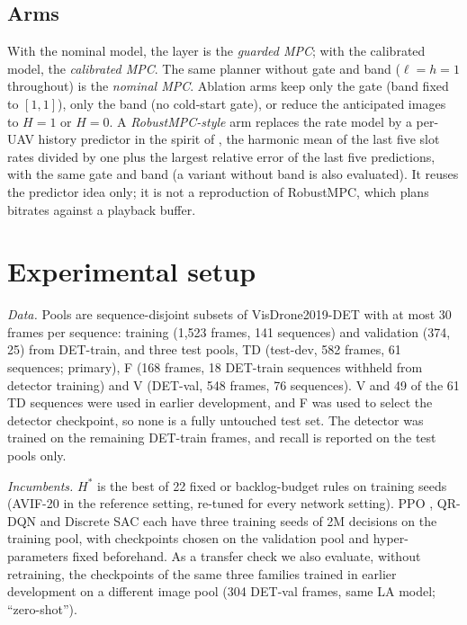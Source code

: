 \documentclass[final,3p,times,twocolumn]{elsarticle}
\begin{document}
\subsection{Arms}
With the nominal model, the layer is the \emph{guarded MPC}; with the calibrated model, the \emph{calibrated MPC}.
The same planner without gate and band ($\ell{=}h{=}1$ throughout) is the \emph{nominal MPC}. Ablation arms keep only
the gate (band fixed to $[1,1]$), only the band (no cold-start gate), or reduce the anticipated images to $H{=}1$ or
$H{=}0$. A \emph{RobustMPC-style} arm replaces the rate model by a per-UAV history predictor in the spirit of
\cite{yin2015}, the harmonic mean of the last five slot rates divided by one plus the largest relative error of the
last five predictions, with the same gate and band (a variant without band is also evaluated). It reuses the
predictor idea only; it is not a reproduction of RobustMPC, which plans bitrates against a playback buffer.

\section{Experimental setup}\label{sec:setup}
\emph{Data.} Pools are sequence-disjoint subsets of VisDrone2019-DET with at most 30 frames per sequence: training
(1,523 frames, 141 sequences) and validation (374, 25) from DET-train, and three test pools, TD (test-dev, 582 frames,
61 sequences; primary), F (168 frames, 18 DET-train sequences withheld from detector training) and V (DET-val, 548
frames, 76 sequences). V and 49 of the 61 TD sequences were used in earlier development, and F was used to select the
detector checkpoint, so none is a fully untouched test set. The detector was trained on the remaining DET-train frames,
and recall is reported on the test pools only.

\emph{Incumbents.} $H^*$ is the best of 22 fixed or backlog-budget rules on training seeds (AVIF-20 in the reference
setting, re-tuned for every network setting). PPO \cite{schulman2017}, QR-DQN \cite{dabney2018} and Discrete SAC
\cite{christodoulou2019} each have three training seeds of 2M decisions on the training pool, with checkpoints chosen
on the validation pool and hyper-parameters fixed beforehand. As a transfer check we also evaluate, without
retraining, the checkpoints of the same three families trained in earlier development on a different image pool (304
DET-val frames, same LA model; ``zero-shot'').
\end{document}
